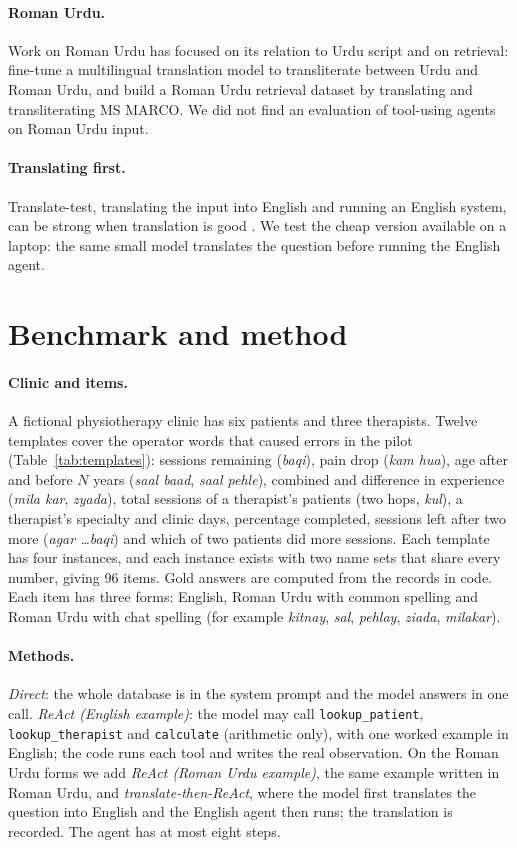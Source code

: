 \documentclass[11pt]{article}
\begin{document}
\paragraph{Roman Urdu.} Work on Roman Urdu has focused on its relation to Urdu script and on retrieval: \citet{butt2025transliteration} fine-tune a multilingual translation model to transliterate between Urdu and Roman Urdu, and \citet{butt2025romanir} build a Roman Urdu retrieval dataset by translating and transliterating MS MARCO. We did not find an evaluation of tool-using agents on Roman Urdu input.

\paragraph{Translating first.} Translate-test, translating the input into English and running an English system, can be strong when translation is good \citep{artetxe2023revisiting}. We test the cheap version available on a laptop: the same small model translates the question before running the English agent.

\section{Benchmark and method}
\paragraph{Clinic and items.} A fictional physiotherapy clinic has six patients and three therapists. Twelve templates cover the operator words that caused errors in the pilot (Table~\ref{tab:templates}): sessions remaining (\emph{baqi}), pain drop (\emph{kam hua}), age after and before $N$ years (\emph{saal baad}, \emph{saal pehle}), combined and difference in experience (\emph{mila kar}, \emph{zyada}), total sessions of a therapist's patients (two hops, \emph{kul}), a therapist's specialty and clinic days, percentage completed, sessions left after two more (\emph{agar \dots baqi}) and which of two patients did more sessions. Each template has four instances, and each instance exists with two name sets that share every number, giving 96 items. Gold answers are computed from the records in code. Each item has three forms: English, Roman Urdu with common spelling and Roman Urdu with chat spelling (for example \emph{kitnay}, \emph{sal}, \emph{pehlay}, \emph{ziada}, \emph{milakar}).

\paragraph{Methods.} \emph{Direct}: the whole database is in the system prompt and the model answers in one call. \emph{ReAct (English example)}: the model may call \texttt{lookup\_patient}, \texttt{lookup\_therapist} and \texttt{calculate} (arithmetic only), with one worked example in English; the code runs each tool and writes the real observation. On the Roman Urdu forms we add \emph{ReAct (Roman Urdu example)}, the same example written in Roman Urdu, and \emph{translate-then-ReAct}, where the model first translates the question into English and the English agent then runs; the translation is recorded. The agent has at most eight steps.
\end{document}
